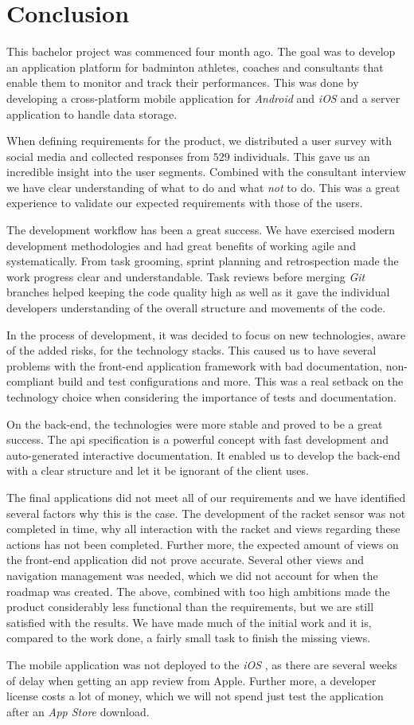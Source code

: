 \chapter{Conclusion}
This bachelor project was commenced four month ago.
The goal was to develop an application platform for badminton athletes, coaches and consultants that enable them to monitor and track their performances.
This was done by developing a cross-platform mobile application for \textit{Android} and \textit{iOS} and a server application to handle data storage.

When defining requirements for the product, we distributed a user survey with social media and collected responses from $529$ individuals.
This gave us an incredible insight into the user segments.
Combined with the consultant interview we have clear understanding of what to do and what \textit{not} to do.
This was a great experience to validate our expected requirements with those of the users.

The development workflow has been a great success.
We have exercised modern development methodologies and had great benefits of working agile and systematically.
From task grooming, sprint planning and retrospection made the work progress clear and understandable.
Task reviews before merging \textit{Git} branches helped keeping the code quality high as well as it gave the individual developers understanding of the overall structure and movements of the code.

In the process of development, it was decided to focus on new technologies, aware of the added risks, for the technology stacks.
This caused us to have several problems with the front-end application framework  with bad documentation, non-compliant build and test configurations and more.
This was a real setback on the technology choice when considering the importance of tests and documentation.

On the back-end, the technologies were more stable and proved to be a great success.
The \gls{api} specification  is a powerful concept with fast development and auto-generated interactive documentation.
It enabled us to develop the back-end with a clear structure and let it be ignorant of the client uses.

The final applications did not meet all of our requirements and we have identified several factors why this is the case.
The development of the racket sensor was not completed in time, why all interaction with the racket and views regarding these actions has not been completed.
Further more, the expected amount of views on the front-end application did not prove accurate. 
Several other views and navigation management was needed, which we did not account for when the roadmap was created.
The above, combined with too high ambitions made the product considerably less functional than the requirements, but we are still satisfied with the results.
We have made much of the initial work and it is, compared to the work done, a fairly small task to finish the missing views.

The mobile application was not deployed to the \textit{iOS} , as there are several weeks of delay when getting an app review from Apple.
Further more, a developer license costs a lot of money, which we will not spend just test the application after an \textit{App Store} download.
